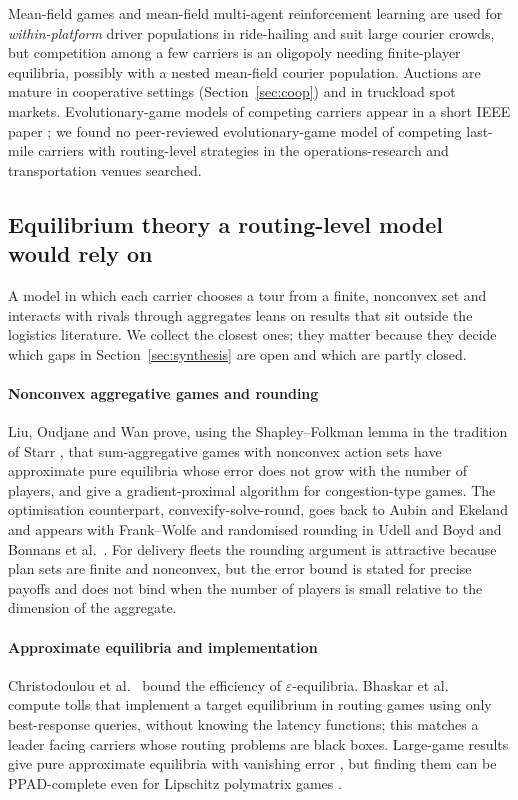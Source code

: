 \documentclass[preprint,12pt]{elsarticle}
\begin{document}
Mean-field games and mean-field multi-agent reinforcement learning are used for \emph{within-platform} driver populations in ride-hailing \cite{Li2019,Lauriere2022} and suit large courier crowds, but competition among a few carriers is an oligopoly needing finite-player equilibria, possibly with a nested mean-field courier population. Auctions are mature in cooperative settings (Section~\ref{sec:coop}) and in truckload spot markets. Evolutionary-game models of competing carriers appear in a short IEEE paper \cite{Kaewpuang2023}; we found no peer-reviewed evolutionary-game model of competing last-mile carriers with routing-level strategies in the operations-research and transportation venues searched.

\subsection{Equilibrium theory a routing-level model would rely on}\label{sec:eqtheory}

A model in which each carrier chooses a tour from a finite, nonconvex set and interacts with rivals through aggregates leans on results that sit outside the logistics literature. We collect the closest ones; they matter because they decide which gaps in Section~\ref{sec:synthesis} are open and which are partly closed.

\paragraph{Nonconvex aggregative games and rounding} Liu, Oudjane and Wan \cite{Liu2023} prove, using the Shapley--Folkman lemma in the tradition of Starr \cite{Starr1969}, that sum-aggregative games with nonconvex action sets have approximate pure equilibria whose error does not grow with the number of players, and give a gradient-proximal algorithm for congestion-type games. The optimisation counterpart, convexify-solve-round, goes back to Aubin and Ekeland \cite{Aubin1976} and appears with Frank--Wolfe and randomised rounding in Udell and Boyd \cite{Udell2016} and Bonnans et al.\ \cite{Bonnans2023}. For delivery fleets the rounding argument is attractive because plan sets are finite and nonconvex, but the error bound is stated for precise payoffs and does not bind when the number of players is small relative to the dimension of the aggregate.

\paragraph{Approximate equilibria and implementation} Christodoulou et al.\ \cite{Christodoulou2011} bound the efficiency of $\varepsilon$-equilibria. Bhaskar et al.\ \cite{Bhaskar2014,Bhaskar2019} compute tolls that implement a target equilibrium in routing games using only best-response queries, without knowing the latency functions; this matches a leader facing carriers whose routing problems are black boxes. Large-game results give pure approximate equilibria with vanishing error \cite{Kalai2004,Azrieli2013}, but finding them can be PPAD-complete even for Lipschitz polymatrix games \cite{Goldberg2023}.
\end{document}
